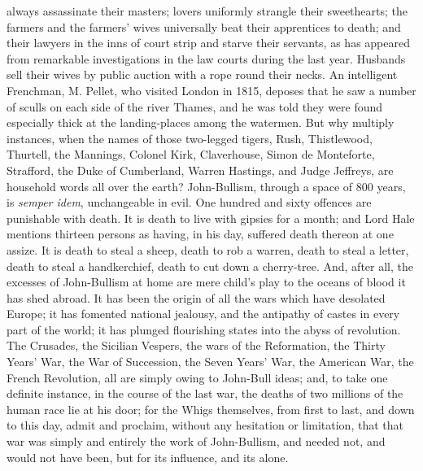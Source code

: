 always assassinate their masters; lovers uniformly
strangle their sweethearts; the farmers and the farmers'
wives universally beat their apprentices to death; and
their lawyers in the inns of court strip and starve their
servants, as has appeared from remarkable investigations
in the law courts during the last year. Husbands sell
their wives by public auction with a rope round their
necks. An intelligent Frenchman, M. Pellet, who visited
London in 1815, deposes that he saw a number of sculls on
each side of the river Thames, and he was told they were
found especially thick at the landing-places among the
watermen. But why multiply instances, when the names of
those two-legged tigers, Rush, Thistlewood, Thurtell, the
Mannings, Colonel Kirk, Claverhouse, Simon de Monteforte,
Strafford, the Duke of Cumberland, Warren Hastings, and
Judge Jeffreys, are household words all over the earth?
John-Bullism, through a space of 800 years, is \emph{semper
idem}, unchangeable in evil. One hundred and sixty
offences are punishable with death. It is death to live
with gipsies for a month; and Lord Hale mentions thirteen
persons as having, in his day, suffered death thereon at
one assize. It is death to steal a sheep, death to rob a
warren, death to steal a letter, death to steal a
handkerchief, death to cut down a cherry-tree. And, after
all, the excesses of John-Bullism at home are mere
child's play to the oceans of blood it has shed abroad.
It has been the origin of all the wars which have
desolated Europe; it has fomented national jealousy, and
the antipathy of castes in every part of the world; it
has plunged flourishing states into the abyss of
revolution. The Crusades, the Sicilian Vespers, the wars
of the Reformation, the Thirty Years' War, the War of
Succession, the Seven Years' War, the American War, the
French Revolution, all are simply owing to John-Bull
ideas; and, to take one definite instance, in the course
of the last war, the deaths of two millions of the human
race lie at his door; for the Whigs themselves, from
first to last, and down to this day, admit and proclaim,
without any hesitation or limitation, that that war was
simply and entirely the work of John-Bullism, and needed
not, and would not have been, but for its influence, and
its alone.


